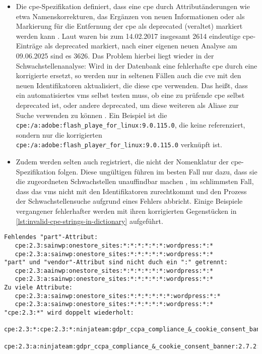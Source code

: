 \begin{itemize}
    \item Die \acrshort{cpe}-Spezifikation definiert, dass eine \acrshort{cpe} durch Attributänderungen wie etwa Namenskorrekturen, das Ergänzen von neuen Informationen oder als Markierung für die Entfernung der \acrshort{cpe} als deprecated (veraltet) markiert werden kann \autocite{Cichonski_Waltermire_Scarfone_2011}.
    Laut \textcite{Sanguino_Uetz_2017} waren bis zum 14.02.2017 insgesamt 2614 eindeutige \acrshort{cpe}-Einträge als deprecated markiert, nach einer eigenen neuen Analyse am 09.06.2025 sind es 3626.
    Das Problem hierbei liegt wieder in der Schwachstellenanalyse:
    Wird in der Datenbank eine fehlerhafte \acrshort{cpe} durch eine korrigierte ersetzt, so werden nur in seltenen Fällen auch die \acrshort{cve} mit den neuen Identifikatoren aktualisiert, die diese \acrshort{cpe} verwenden.
    Das heißt, dass ein automatisiertes \acrshort{vms} selbst testen muss, ob eine zu prüfende \acrshort{cpe} selbst deprecated ist, oder andere deprecated, um diese weiteren  als Aliase zur Suche verwenden zu können \autocite{Sanguino_Uetz_2017}.
    Ein Beispiel ist die \texttt{cpe:/a:adobe:flash\_playe\_for\_linux:9.0.115.0}, die keine  referenziert, sondern nur die korrigierten \texttt{cpe:/a:adobe:flash\_playe\textit{r}\_for\_linux:9.0.115.0} verknüpft ist.

    \item Zudem werden selten auch  registriert, die nicht der Nomenklatur der \acrshort{cpe}-Spezifikation folgen.
    Diese ungültigen  führen im besten Fall nur dazu, dass sie die zugeordneten Schwachstellen unauffindbar machen \autocite{Takahashi_Miyamoto_Nakao_2016}, im schlimmsten Fall, dass das \acrshort{vms} nicht mit den Identifikatoren zurechtkommt und den Prozess der Schwachstellensuche aufgrund eines Fehlers abbricht.
    Einige Beispiele vergangener fehlerhafter  werden mit ihren korrigierten Gegenstücken in \autoref{lst:invalid-cpe-strings-in-dictionary} aufgeführt.
\end{itemize}

\begin{lstlisting}[caption=Ungültige CPE 2.3 Format Strings aus dem NVD CPE Dictionary und ihre korrigierten Gegenstücke,label=lst:invalid-cpe-strings-in-dictionary]
Fehlendes "part"-Attribut:
   cpe:2.3:sainwp:onestore_sites:*:*:*:*:*:*:wordpress:*:*
   cpe:2.3:a:sainwp:onestore_sites:*:*:*:*:*:wordpress:*:*
"part" und "vendor"-Attribut sind nicht duch ein ":" getrennt:
   cpe:2.3:aainwp:onestore_sites:*:*:*:*:*:*:wordpress:*:*
   cpe:2.3:a:sainwp:onestore_sites:*:*:*:*:*:wordpress:*:*
Zu viele Attribute:
   cpe:2.3:a:sainwp:onestore_sites:*:*:*:*:*:*:wordpress:*:*
   cpe:2.3:a:sainwp:onestore_sites:*:*:*:*:*:wordpress:*:*
"cpe:2.3:*" wird doppelt wiederholt:
   cpe:2.3:*:cpe:2.3:*:ninjateam:gdpr_ccpa_compliance_&_cookie_consent_banner:2.7.2:*:*:*:*:wordpress:*:*
   cpe:2.3:a:ninjateam:gdpr_ccpa_compliance_&_cookie_consent_banner:2.7.2:*:*:*:*:wordpress:*:*
\end{lstlisting}

